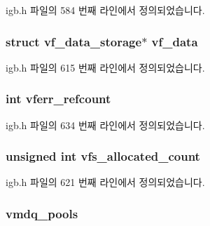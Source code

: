 igb.\+h 파일의 584 번째 라인에서 정의되었습니다.

\subsubsection[{\texorpdfstring{vf\+\_\+data}{vf_data}}]{\setlength{\rightskip}{0pt plus 5cm}struct {\bf vf\+\_\+data\+\_\+storage}$\ast$ vf\+\_\+data}\hypertarget{structigb__adapter_a64f983b74b075dff5aacd4c5bd24dff7}{}\label{structigb__adapter_a64f983b74b075dff5aacd4c5bd24dff7}


igb.\+h 파일의 615 번째 라인에서 정의되었습니다.

\subsubsection[{\texorpdfstring{vferr\+\_\+refcount}{vferr_refcount}}]{\setlength{\rightskip}{0pt plus 5cm}int vferr\+\_\+refcount}\hypertarget{structigb__adapter_abc9033e3e4f6d93e0e3404cd8d776d3d}{}\label{structigb__adapter_abc9033e3e4f6d93e0e3404cd8d776d3d}


igb.\+h 파일의 634 번째 라인에서 정의되었습니다.

\subsubsection[{\texorpdfstring{vfs\+\_\+allocated\+\_\+count}{vfs_allocated_count}}]{\setlength{\rightskip}{0pt plus 5cm}unsigned int vfs\+\_\+allocated\+\_\+count}\hypertarget{structigb__adapter_a2a0001d0468c7817f65c61ef6a6f4fa4}{}\label{structigb__adapter_a2a0001d0468c7817f65c61ef6a6f4fa4}


igb.\+h 파일의 621 번째 라인에서 정의되었습니다.

\subsubsection[{\texorpdfstring{vmdq\+\_\+pools}{vmdq_pools}}]{ vmdq\+\_\+pools}\hypertarget{structigb__adapter_a060f1655e3aa667407ed63d23adbbe5d}{}\label{structigb__adapter_a060f1655e3aa667407ed63d23adbbe5d}


